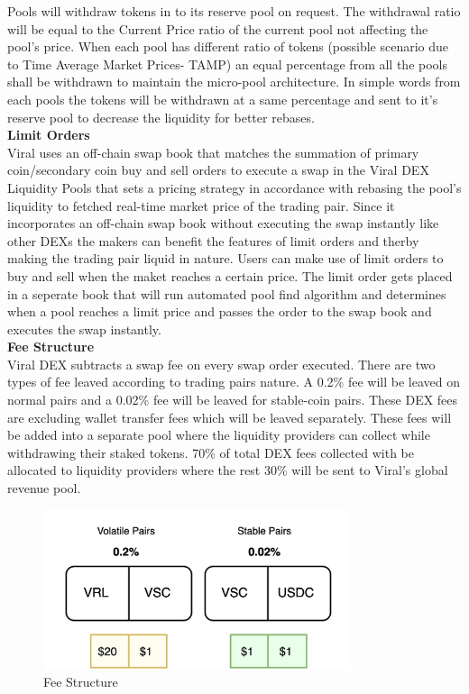 \documentclass[10pt]{article}
\begin{document}
Pools will withdraw tokens in to its reserve pool on request. The withdrawal ratio will be equal to the Current Price ratio of the current pool not affecting the pool's price. When each pool has different ratio of tokens (possible scenario due to Time Average Market Prices- TAMP) an equal percentage from all the pools shall be withdrawn to maintain the micro-pool architecture. In simple words from each pools the tokens will be withdrawn at a same percentage and sent to it's reserve pool to decrease the liquidity for better rebases.\\


\textbf{Limit Orders}\\

Viral uses an off-chain swap book that matches the summation of primary coin/secondary coin buy and sell orders to execute a swap in the Viral DEX Liquidity Pools that sets a pricing strategy in accordance with rebasing the pool's liquidity to fetched real-time market price of the trading pair. Since it incorporates an off-chain swap book without executing the swap instantly like other DEXs the makers can benefit the features of limit orders and therby making the trading pair liquid in nature. Users can make use of limit orders to buy and sell when the maket reaches a certain price. The limit order gets placed in a seperate book that will run automated pool find algorithm and determines when a pool reaches a limit price and passes the order to the swap book and executes the swap instantly.\\


\textbf{Fee Structure}\\

Viral DEX subtracts a swap fee on every swap order executed. There are two types of fee leaved according to trading pairs nature. A 0.2\% fee will be leaved on normal pairs and a 0.02\% fee will be leaved for stable-coin pairs. These DEX fees are excluding wallet transfer fees which will be leaved separately. These fees will be added into a separate pool where the liquidity providers can collect while withdrawing their staked tokens. 70\% of total DEX fees collected with be allocated to liquidity providers where the rest 30\% will be sent to Viral's global revenue pool.\\

\begin{figure}[H]
\begin{center}
\includegraphics[width=9cm]{dex-fee}
\caption{Fee Structure}
\end{center}
\end{figure}
\end{document}
